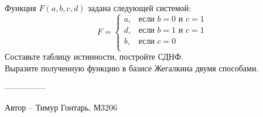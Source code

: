 \question
Функция $F(a, b, c, d)$ задана следующей системой:
\begin{equation*}
    F =
    \begin{cases}
        a, &\text{если $b=0$ и $c=1$}\\
        d, &\text{если $b=1$ и $c=1$}\\
        b, &\text{если $c=0$}\\
    \end{cases}
\end{equation*}
Составьте таблицу истинности, постройте СДНФ.
\\
Выразите полученную функцию в базисе Жегалкина двумя способами.

---------------

Автор -- Тимур Гонтарь, М3206